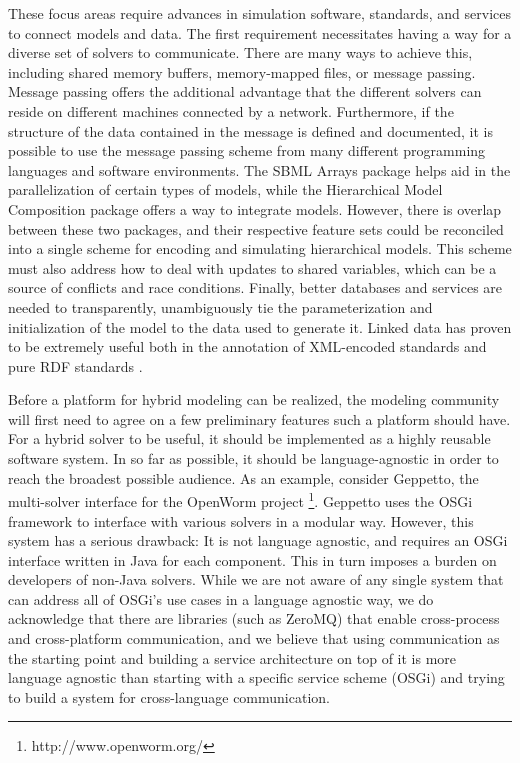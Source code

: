 \documentclass[journal,transmag,twoside]{IEEEtran}
\begin{document}
These focus areas require advances in simulation software, standards, and services to connect models and data. The first requirement necessitates having a way for a diverse set of solvers to communicate. There are many ways to achieve this, including shared memory buffers, memory-mapped files, or message passing. Message passing offers the additional advantage that the different solvers can reside on different machines connected by a network. Furthermore, if the structure of the data contained in the message is defined and documented, it is possible to use the message passing scheme from many different programming languages and software environments. The SBML Arrays package \cite{watanabe2016efficient} helps aid in the parallelization of certain types of models, while the Hierarchical Model Composition package \cite{smith2015sbml} offers a way to integrate models. However, there is overlap between these two packages, and their respective feature sets could be reconciled into a single scheme for encoding and simulating hierarchical models. This scheme must also address how to deal with updates to shared variables, which can be a source of conflicts and race conditions. Finally, better databases and services are needed to transparently, unambiguously tie the parameterization and initialization of the model to the data used to generate it. Linked data has proven to be extremely useful both in the annotation of XML-encoded standards \cite{novere2005minimum} and pure RDF standards \cite{galdzicki2014synthetic}.

Before a platform for hybrid modeling can be realized, the modeling community will first need to agree on a few preliminary features such a platform should have. For a hybrid solver to be useful, it should be implemented as a highly reusable software system. In so far as possible, it should be language-agnostic in order to reach the broadest possible audience. As an example, consider Geppetto, the multi-solver interface for the OpenWorm project \footnote{http://www.openworm.org/}. Geppetto uses the OSGi framework to interface with various solvers in a modular way. However, this system has a serious drawback: It is not language agnostic, and requires an OSGi interface written in Java for each component. This in turn imposes a burden on developers of non-Java solvers. While we are not aware of any single system that can address all of OSGi's use cases in a language agnostic way, we do acknowledge that there are libraries (such as ZeroMQ) that enable cross-process and cross-platform communication, and we believe that using communication as the starting point and building a service architecture on top of it is more language agnostic than starting with a specific service scheme (OSGi) and trying to build a system for cross-language communication.
\end{document}
